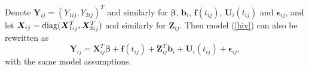 \documentclass[12pt, notitlepage]{article}
\begin{document}
Denote $\bm Y_{ij} = (Y_{1ij}, Y_{2ij})^T$ and similarly for $\bm \beta$, $\bm b_i$, $\bm f(t_{ij})$, $\bm U_i(t_{ij})$ and $\bm \epsilon_{ij}$, and let $\bm X_{ij} = {\rm diag} (\bm X_{1ij}^T, \bm X_{2ij}^T)$ and similarly for $\bm Z_{ij}$. 
Then  model (\ref{biv}) can also be rewritten as 
\begin{equation} \label{biv2}
\boldsymbol Y_{ij} 
=
\boldsymbol X_{ij}^T\boldsymbol{\beta} +
\boldsymbol f(t_{ij}) + \boldsymbol Z_{ij}^T
\boldsymbol b_{i} + 
\boldsymbol U_{i}(t_{ij}) + 
\boldsymbol \epsilon_{ij},
\end{equation}
with the same model assumptions. 
\end{document}
